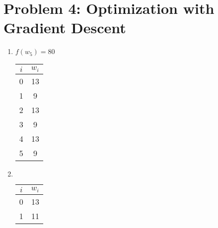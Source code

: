\documentclass[11pt]{article}
\begin{document}
	\section*{Problem 4: Optimization with Gradient Descent}
	\begin{enumerate}[(1)]
		\item $f(w_5) = 80$
		\begin{center}
			\begin{tabular}{|c|c|}
				\hline
				$i$ & $w_i$ \\
				\hline
				0 & 13 \\
				1 & 9 \\
				2 & 13 \\
				3 & 9 \\
				4 & 13 \\
				5 & 9 \\
				\hline
			\end{tabular}
		\end{center}
		\item$~$
		\begin{center}
			\begin{tabular}{|c|c|}
				\hline
				$i$ & $w_i$ \\
				\hline
				0 & 13 \\
				1 & 11 \\
				\hline
			\end{tabular}
		\end{center}
	\end{enumerate}
\end{document}
